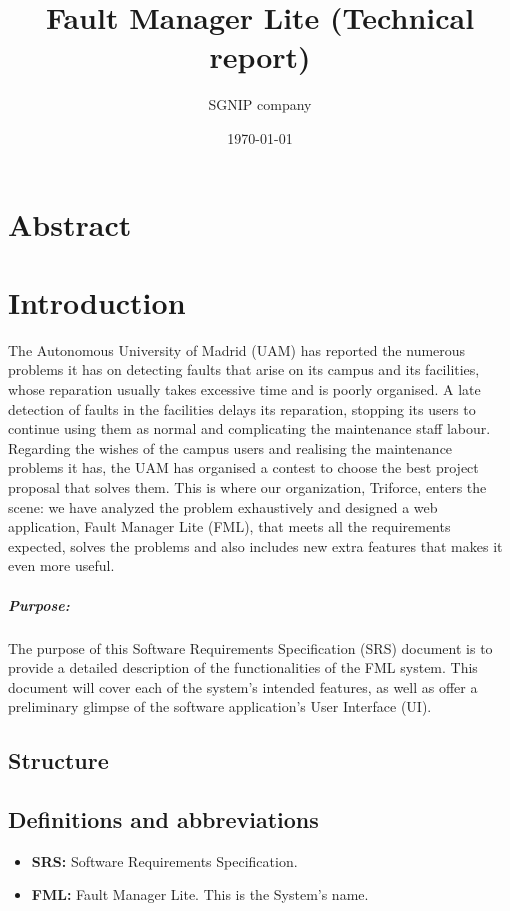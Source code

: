 \documentclass{report}
\title{Fault Manager Lite (Technical report)}
\date{\today}
\author{SGNIP company}
\begin{document}
\maketitle
\tableofcontents
\newpage
\chapter{Abstract}

\chapter{Introduction}

The Autonomous University of Madrid (UAM) has reported the numerous problems it has on detecting faults that arise on its campus and its facilities, whose reparation usually takes excessive time and is poorly organised. A late detection of faults in the facilities delays its reparation, stopping its users to continue using them as normal and complicating the maintenance staff labour. Regarding the wishes of the campus users and realising the maintenance problems it has, the UAM has organised a contest to choose the best project proposal that solves them. 
This is where our organization, Triforce, enters the scene: we have analyzed the problem exhaustively and designed a web application, Fault Manager Lite (FML), that meets all the requirements expected, solves the problems and also includes new extra features that makes it even more useful. 

\paragraph{Purpose: }
The purpose of this Software Requirements Specification (SRS) document is to provide a
detailed description of the functionalities of the FML system. This document will cover each of the system's intended features, as well as offer a preliminary glimpse of the software application's User Interface (UI). 

\section{Structure}

\section{Definitions and abbreviations}

\begin{itemize}
\item \textbf{SRS: } Software Requirements Specification.

\item \textbf{FML: } Fault Manager Lite. This is the System's name.

\end{itemize}
\end{document}
